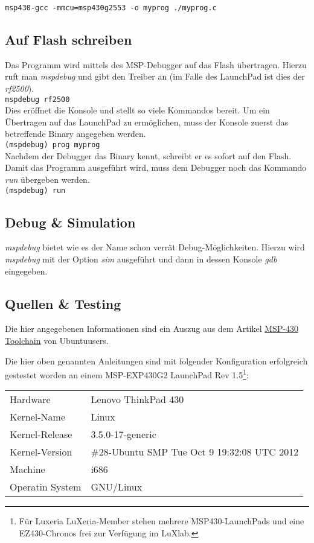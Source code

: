 \verb?msp430-gcc -mmcu=msp430g2553 -o myprog ./myprog.c?

\subsection{Auf Flash schreiben}
Das Programm wird mittels des MSP-Debugger auf das Flash übertragen. Hierzu
ruft man \emph{mspdebug} und gibt den Treiber an (im Falle des LaunchPad ist
dies der \emph{rf2500}).\\

\verb?mspdebug rf2500?\\

\noindent
Dies eröffnet die Konsole und stellt so viele Kommandos bereit. Um ein 
Übertragen auf das LaunchPad zu ermöglichen, muss der Konsole zuerst das
betreffende Binary angegeben werden.\\

\verb?(mspdebug) prog myprog?\\

\noindent
Nachdem der Debugger das Binary kennt, schreibt er es sofort auf den Flash.
Damit das Programm ausgeführt wird, muss dem Debugger noch das Kommando 
\emph{run} übergeben werden.\\

\verb?(mspdebug) run?

\subsection{Debug \& Simulation}
\emph{mspdebug} bietet wie es der Name schon verrät Debug-Möglichkeiten.
Hierzu wird \emph{mspdebug} mit der Option \emph{sim} ausgeführt und
dann in dessen Konsole \emph{gdb} eingegeben.

\subsection{Quellen \& Testing}
Die hier angegebenen Informationen sind ein Auszug aus dem Artikel
\href{http://wiki.ubuntuusers.de/MSP430-Toolchain}{MSP-430 Toolchain} von 
Ubuntuusers. 

Die hier oben genannten Anleitungen sind mit folgender Konfiguration
erfolgreich gestestet worden an einem MSP-EXP430G2 LaunchPad Rev 1.5\footnote{
    Für Luxeria LuXeria-Member stehen mehrere MSP430-LaunchPads und eine
    EZ430-Chronos frei zur Verfügung im LuXlab.}:

\begin{table}[h!]
\centering
\begin{tabular}{ l l }
Hardware        & Lenovo ThinkPad 430 \\
Kernel-Name     & Linux \\
Kernel-Release  & 3.5.0-17-generic \\
Kernel-Version  & \#28-Ubuntu SMP Tue Oct 9 19:32:08 UTC 2012 \\
Machine         & i686 \\
Operatin System & GNU/Linux\\
\end{tabular}
\end{table}

